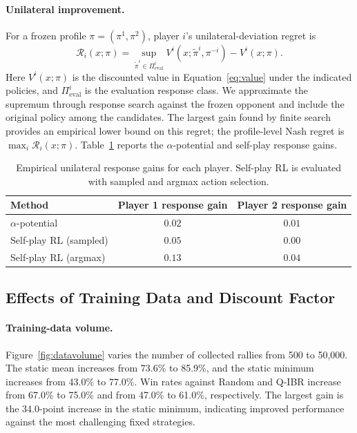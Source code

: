 \documentclass[pmlr]{jmlr}
\begin{document}
\paragraph{Unilateral improvement.}
For a frozen profile $\pi=(\pi^1,\pi^2)$, player $i$'s unilateral-deviation regret is
\begin{equation}
  \mathcal{R}_i(x;\pi)=
  \sup_{\widetilde\pi^i\in\Pi^i_{\mathrm{eval}}}
  V^i(x;\widetilde\pi^i,\pi^{-i})-V^i(x;\pi).
  \label{eq:empiricalregret}
\end{equation}
Here $V^i(x;\pi)$ is the discounted value in Equation~\eqref{eq:value} under the indicated policies, and $\Pi^i_{\mathrm{eval}}$ is the evaluation response class. We approximate the supremum through response search against the frozen opponent and include the original policy among the candidates. The largest gain found by finite search provides an empirical lower bound on this regret; the profile-level Nash regret is $\max_i\mathcal{R}_i(x;\pi)$. Table~\ref{tab:regret} reports the $\alpha$-potential and self-play response gains.

\begin{table}[tbp]
\centering
\small
\begin{tabular}{lcc}
\toprule
Method & Player 1 response gain & Player 2 response gain\\
\midrule
$\alpha$-potential & $0.02$ & $0.01$\\
Self-play RL (sampled) & $0.05$ & $0.00$\\
Self-play RL (argmax) & $0.13$ & $0.04$\\
\bottomrule
\end{tabular}
\caption{Empirical unilateral response gains for each player. Self-play RL is evaluated with sampled and argmax action selection.}
\label{tab:regret}
\end{table}

\subsection{Effects of Training Data and Discount Factor}
\label{sec:resultsablation}

\paragraph{Training-data volume.}
Figure~\ref{fig:datavolume} varies the number of collected rallies from 500 to 50,000. The static mean increases from 73.6\% to 85.9\%, and the static minimum increases from 43.0\% to 77.0\%. Win rates against Random and Q-IBR increase from 67.0\% to 75.0\% and from 47.0\% to 61.0\%, respectively. The largest gain is the 34.0-point increase in the static minimum, indicating improved performance against the most challenging fixed strategies.
\end{document}
